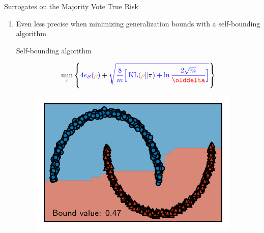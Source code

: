 \documentclass{slides}
\begin{document}
\begin{xframe}{Surrogates on the Majority Vote True Risk}
\begin{enumerate}
\item Even less precise when minimizing generalization bounds with a self-bounding algorithm\\
\begin{minipage}{0.50\linewidth}
\begin{center}
Self-bounding algorithm
\end{center}
\begin{align*}
\min_{\Q} \LC \blue{4e_{\dS}(\Q)} + \blue{\sqrt{\frac{8}{m}\Big[\KL(\orange\Q\|\black{\P}) +\ln\frac{2\sqrt{m}}{\delta}\Big]}} \RC
\end{align*}
\end{minipage}
\hfill
\begin{minipage}{0.49\linewidth}
\begin{figure}
    \centering
    \includegraphics[width=0.7\linewidth]{figures/moons_bound.pdf}
\end{figure}
\end{minipage}
\end{enumerate}
\end{xframe}

\end{document}
